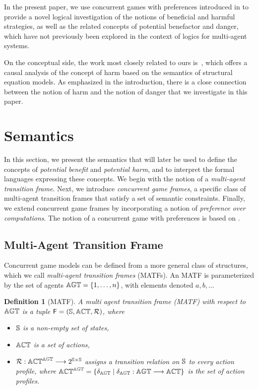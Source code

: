 \documentclass{article}
\newtheorem{definition}{Definition}
\begin{document}
In the present paper, we  use  concurrent games with preferences introduced in \cite{DBLP:conf/ifaamas/LiLM25}  to provide a novel logical investigation  of the notions of  beneficial  and  harmful  strategies, as well as the related concepts of  potential benefactor  and  danger, which have not previously been explored in the context of logics for multi-agent systems.
 

 

On the conceptual side, the work most closely related to ours is~\cite{BeckersChocklerHalpern2024}, which offers a causal analysis of the concept of harm based on the semantics of structural equation models. As emphasized in the introduction, there is a close connection between the notion of harm  and the notion of  danger that we investigate in this paper.
 


\section{Semantics}\label{sec:semantics}
 

In this section, we present the semantics that will later be used to define the concepts of \emph{potential benefit} and \emph{potential harm}, and to interpret the formal languages expressing these concepts. We begin with the notion of a \emph{multi-agent transition frame}. Next, we introduce \emph{concurrent game frames}, a specific class of multi-agent transition frames that satisfy a set of semantic constraints. Finally, we extend concurrent game frames by incorporating a notion of \emph{preference over computations}. 
The notion of a concurrent game with preferences is based on \cite{DBLP:conf/ifaamas/LiLM25}.




\subsection{Multi-Agent Transition Frame }

Concurrent game models can be defined from a more general class of structures, which we call \emph{multi-agent transition frames} (MATFs). An MATF is parameterized by the set of agents $\mathbb{AGT} = \{ 1,\ldots, n\}$, with elements denoted $a,b,\ldots$
\begin{definition}[MATF]\label{def: MATF}
    A multi agent transition frame (MATF) with respect to $\mathbb{AGT}$
    is a tuple 
    $\mathsf{F}  = (\mathbb{S},  \mathbb{ACT}, \mathcal{R})$,
    where
    \begin{itemize}
    \item $\mathbb{S}$ is a non-empty set of states,
    \item $\mathbb{ACT}$ is a set of actions,
    \item $\mathcal{R}: \mathbb{ACT}^{\mathbb{AGT}}\longrightarrow 2^{\mathbb{S}\times \mathbb{S}}$ assigns a transition relation on $\mathbb{S}$ to every action profile, where $\mathbb{ACT}^{\mathbb{AGT}}=\{\delta_{\mathbb{AGT}}
    \mid \delta_{\mathbb{AGT}}:
    \mathbb{AGT} \longrightarrow \mathbb{ACT}\}$ is the set of action profiles.
    \end{itemize}
\end{definition}
\end{document}
